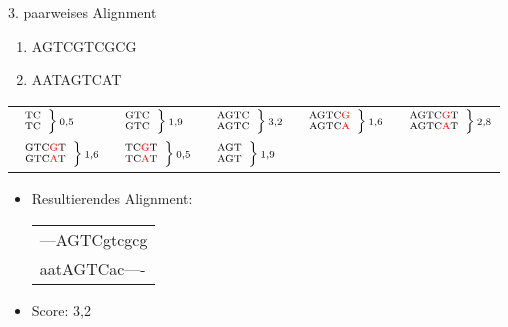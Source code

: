\documentclass[wide,xcolor={x11names},hyperref={colorlinks=false},pantone312]{beamer}
\begin{document}
\begin{frame}[t]{3. paarweises Alignment}
	\small
	\ttfamily
	\begin{enumerate}
		\item AGTCGTCGCG
		\item AATAGTCAT
		\normalfont
	\end{enumerate}
	\begin{tabular*}{12cm}{lllll}
		\rule{0pt}{4ex}
		$ \scriptsize \left. \begin{array}{c} \mbox{TC}\\\mbox{TC} \end{array} \right \} \mbox{0,5}$ & $ \scriptsize \left. \begin{array}{c} \mbox{GTC}\\\mbox{GTC} \end{array} \right \} \mbox{1,9}$ &
		$ \scriptsize \left. \begin{array}{c} \mbox{AGTC}\\\mbox{AGTC} \end{array} \right \} \mbox{3,2}$ & $ \scriptsize \left. \begin{array}{c} \mbox{AGTC\textcolor{red}{G}}\\\mbox{AGTC\textcolor{red}{A}} \end{array} \right \} \mbox{1,6}$ & $ \scriptsize \left. \begin{array}{c} \mbox{AGTC\textcolor{red}{G}T}\\\mbox{AGTC\textcolor{red}{A}T} \end{array} \right \} \mbox{2,8}$ \\
		\rule{0pt}{4ex}
		$ \scriptsize \left. \begin{array}{c} \mbox{GTC\textcolor{red}{G}T}\\\mbox{GTC\textcolor{red}{A}T} \end{array} \right \} \mbox{1,6}$ &
		$ \scriptsize \left. \begin{array}{c} \mbox{TC\textcolor{red}{G}T}\\\mbox{TC\textcolor{red}{A}T} \end{array} \right \} \mbox{0,5}$ &
		$ \scriptsize \left. \begin{array}{c} \mbox{AGT}\\\mbox{AGT} \end{array} \right \} \mbox{1,9}$
	\end{tabular*} \pause
	\begin{itemize}
		\item Resultierendes Alignment: \\
		\ttfamily
		\begin{tabular}{l}
			---AGTCgtcgcg\\
			aatAGTCac----
		\end{tabular}
		\normalfont
		\item Score: 3,2
	\end{itemize}
	\normalfont
	\normalsize	
\end{frame}
\end{document}
